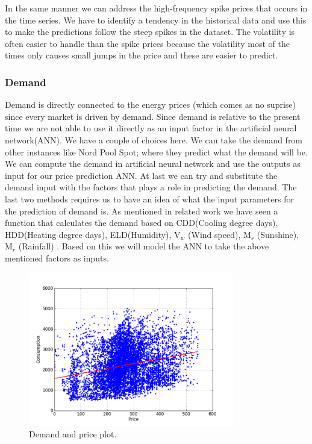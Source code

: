 In the same manner we can address the high-frequency spike prices that occurs in the time series. We have to identify a tendency in the historical data and use this to make the predictions follow the steep spikes in the dataset. The volatility is often easier to handle than the spike prices because the volatility most of the times only causes small jumps in the price and these are easier to predict.

\subsubsection{Demand}
Demand is directly connected to the energy prices (which comes as no suprise) since every market is driven by demand. Since demand is relative to the present time we are not able to use it directly as an input factor in the artificial neural network(ANN). We have a couple of choices here. We can take the demand from other instances like Nord Pool Spot; where they predict what the demand will be. We can compute the demand in artificial neural network and use the outputs as input for our price prediction ANN. At last we can try and substitute the demand input with the factors that plays a role in predicting the demand. The last two methods requires us to have an idea of what the input parameters for the prediction of demand is. As mentioned in related work we have seen a function that calculates the demand based on CDD(Cooling degree days), HDD(Heating degree days), ELD(Humidity), V$_w$ (Wind speed), M$_s$ (Sunshine), M$_r$ (Rainfall) \cite{19}. Based on this we will model the ANN to take the above mentioned factors as inputs.

\begin{figure}[H]
\centering
\includegraphics[width=0.8\textwidth ,natwidth=410,natheight=237]{billeder/energy_price_plots/consump_price.png}
\caption{Demand and price plot.}
\label{fig:consump_price}
\end{figure}

